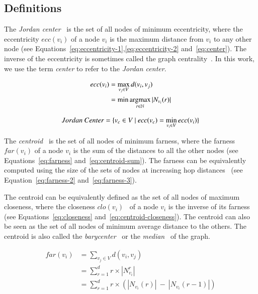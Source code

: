 \subsection{Definitions}

The {\em Jordan center}~\cite{wasserman1994social} is the set of all nodes of minimum eccentricity, where the eccentricity $ecc(v_i)$ of a node $v_i$ is the maximum distance from $v_i$ to any other node (see Equations~\eqref{eq:eccentricity-1},\eqref{eq:eccentricity-2} and~\eqref{eq:center}). The inverse of the eccentricity is sometimes called the graph centrality~\cite{lehmann2003decentralized}. In this work, we use the term {\em center} to refer to the {\em Jordan center}. 

\begin{align}
\normalsize
\label{eq:eccentricity-1}
ecc(v_i) & = \max\limits_{v_j \in V} d(v_i,v_j)\\
\label{eq:eccentricity-2}
& = \min\operatorname*{argmax}\limits_{r \in \mathbb{N}} |N_{v_i}(r)|
\end{align}

\begin{equation}
\normalsize
\label{eq:center}
Jordan\ Center = \{v_c \in V\ |\ ecc(v_c) = \min\limits_{v_i \in V} ecc(v_i) \}
\end{equation}

The {\em centroid}~\cite{dutot:hal-00742845} is the set of all nodes of minimum farness, where the farness $far(v_i)$ of a node $v_i$ is the sum of the distances to all the other nodes (see Equations~\eqref{eq:farness} and~\eqref{eq:centroid-sum}). The farness can be equivalently computed using the size of the sets of nodes at increasing hop distances~\cite{kang2011centralities} (see Equation~\eqref{eq:farness-2} and~\eqref{eq:farness-3}).

The centroid can be equivalently defined as the set of all nodes of maximum closeness, where the closeness $clo(v_i)$~\cite{freeman1979centrality} of a node $v_i$ is the inverse of its farness (see Equations~\eqref{eq:closeness} and~\eqref{eq:centroid-closeness}). The centroid can also be seen as the set of all nodes of minimum average distance to the others. The centroid is also called the {\em barycenter}~\cite{mamei2005self} or the {\em median}~\cite{Korach:1984:DAF:579.585} of the graph.

{
\equationTextSize
\begin{align}
\label{eq:farness}
far(v_i) & = \sum_{v_j \in V} d(v_i,v_j)\\
\label{eq:farness-2}
& = \sum_{r=1}^{d} r \times |N_{v_i}^r|\\
\label{eq:farness-3}
& = \sum_{r=1}^{d} r \times (|N_{v_i}(r)|\ - \ |N_{v_i}(r-1)|)
\end{align}
}

